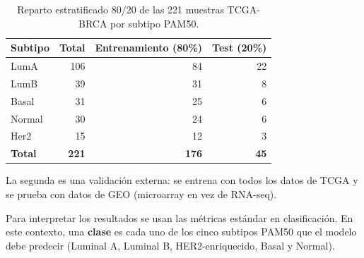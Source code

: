 \documentclass[12pt, a4paper]{report}
\begin{document}
\begin{table}[htbp]
\caption{Reparto estratificado 80/20 de las 221 muestras TCGA-BRCA por subtipo PAM50.}
\label{tab:split}
\centering
\begin{tabular}{lrrr}
\toprule
\textbf{Subtipo} & \textbf{Total} & \textbf{Entrenamiento (80\%)} & \textbf{Test (20\%)} \\
\midrule
LumA   & 106 & 84 & 22 \\
LumB   &  39 & 31 &  8 \\
Basal  &  31 & 25 &  6 \\
Normal &  30 & 24 &  6 \\
Her2   &  15 & 12 &  3 \\
\midrule
\textbf{Total} & \textbf{221} & \textbf{176} & \textbf{45} \\
\bottomrule
\end{tabular}
\end{table}

La segunda es una validación externa: se entrena con todos los datos de TCGA y se prueba con datos de GEO (microarray en vez de RNA-seq).

Para interpretar los resultados se usan las métricas estándar en clasificación. En este contexto, una \textbf{clase} es cada uno de los cinco subtipos PAM50 que el modelo debe predecir (Luminal A, Luminal B, HER2-enriquecido, Basal y Normal).
\end{document}
